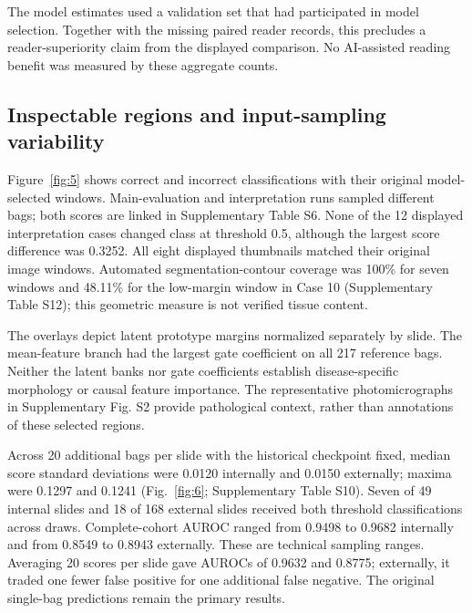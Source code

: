 The model estimates used a validation set that had participated in model selection. Together with the missing paired reader records, this precludes a reader-superiority claim from the displayed comparison. No AI-assisted reading benefit was measured by these aggregate counts.

\MainTableFour
\MainFigureFour

\subsection{Inspectable regions and input-sampling variability}

Figure~\ref{fig:5} shows correct and incorrect classifications with their original model-selected windows. Main-evaluation and interpretation runs sampled different bags; both scores are linked in Supplementary Table S6. None of the 12 displayed interpretation cases changed class at threshold 0.5, although the largest score difference was 0.3252. All eight displayed thumbnails matched their original image windows. Automated segmentation-contour coverage was 100\% for seven windows and 48.11\% for the low-margin window in Case 10 (Supplementary Table S12); this geometric measure is not verified tissue content.

The overlays depict latent prototype margins normalized separately by slide. The mean-feature branch had the largest gate coefficient on all 217 reference bags. Neither the latent banks nor gate coefficients establish disease-specific morphology or causal feature importance. The representative photomicrographs in Supplementary Fig. S2 provide pathological context, rather than annotations of these selected regions. 

\MainFigureFive

Across 20 additional bags per slide with the historical checkpoint fixed, median score standard deviations were 0.0120 internally and 0.0150 externally; maxima were 0.1297 and 0.1241 (Fig.~\ref{fig:6}; Supplementary Table S10). Seven of 49 internal slides and 18 of 168 external slides received both threshold classifications across draws. Complete-cohort AUROC ranged from 0.9498 to 0.9682 internally and from 0.8549 to 0.8943 externally. These are technical sampling ranges. Averaging 20 scores per slide gave AUROCs of 0.9632 and 0.8775; externally, it traded one fewer false positive for one additional false negative. The original single-bag predictions remain the primary results.

\MainFigureSix
\FloatBarrier
